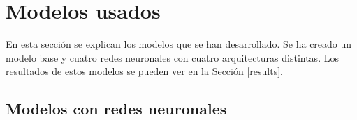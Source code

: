 \section{Modelos usados}

En esta sección se explican los modelos que se han desarrollado. Se ha creado un modelo base y cuatro redes neuronales con cuatro arquitecturas distintas. Los resultados de estos modelos se pueden ver en la Sección \ref{results}.
\newline


\subsection{Modelos con redes neuronales}





